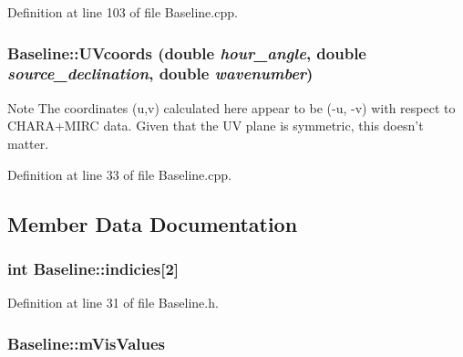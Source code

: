 Definition at line 103 of file Baseline.cpp.

\hypertarget{classBaseline_a44fc7f5773b736303d344174ed4049b2}{
\subsubsection[{UVcoords}]{ Baseline::UVcoords (double {\em hour\_\-angle}, \/  double {\em source\_\-declination}, \/  double {\em wavenumber})}}
\label{classBaseline_a44fc7f5773b736303d344174ed4049b2}


\begin{DoxyNote}{Note}
The coordinates (u,v) calculated here appear to be (-\/u, -\/v) with respect to CHARA+MIRC data. Given that the UV plane is symmetric, this doesn't matter. 
\end{DoxyNote}




Definition at line 33 of file Baseline.cpp.



\subsection{Member Data Documentation}
\hypertarget{classBaseline_af8afd0de67e28cd19f78691d203cb263}{
\subsubsection[{indicies}]{\setlength{\rightskip}{0pt plus 5cm}int {\bf Baseline::indicies}\mbox{[}2\mbox{]}}}
\label{classBaseline_af8afd0de67e28cd19f78691d203cb263}


Definition at line 31 of file Baseline.h.

\hypertarget{classBaseline_a5007d2e286e10dd8c4651422df9b1dcc}{
\subsubsection[{mVisValues}]{ {\bf Baseline::mVisValues}}}
\label{classBaseline_a5007d2e286e10dd8c4651422df9b1dcc}


